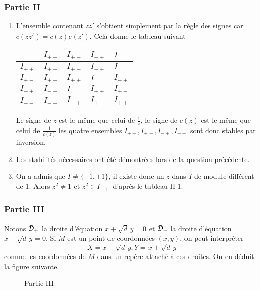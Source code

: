 \subsubsection*{Partie II}
\begin{enumerate}
\item L'ensemble contenant $zz'$ s'obtient simplement par la règle des signes car $c(zz')=c(z)c(z')$. Cela donne le tableau suivant
\begin{center}
\renewcommand{\arraystretch}{1.4}
\begin{tabular}{|c|c|c|c|c|} \hline
         & $I_{++}$ & $I_{+-}$ & $I_{-+}$ & $I_{--}$ \\ \hline
$I_{++}$ & $I_{++}$ & $I_{+-}$ & $I_{-+}$ & $I_{--}$ \\ \hline 
$I_{+-}$ & $I_{+-}$ & $I_{++}$ & $I_{--}$ & $I_{-+}$ \\ \hline
$I_{-+}$ & $I_{-+}$ & $I_{--}$ & $I_{++}$ & $I_{+-}$ \\ \hline
$I_{--}$ & $I_{--}$ & $I_{-+}$ & $I_{+-}$ & $I_{++}$ \\ \hline
\end{tabular}
\end{center}

Le signe de $z$ est le même que celui de $\frac{1}{z}$, le signe de $c(z)$ est le même que celui de $\frac{1}{c(z)}$ les quatre ensembles $I_{++},I_{+-},I_{-+},I_{--}$ sont donc stables par inversion.
\item Les stabilités nécessaires ont été démontrées lors de la question précédente.
\item On a admis que $I\not=\{-1,+1\}$, il existe donc un $z$ dans $I$ de module différent de 1. Alors $z^2 \not=1$ et $z^2\in I_{++}$ d'après le tableau II 1.
\end{enumerate}
\subsubsection*{Partie III}
Notons $\cal{D}_{+}$ la droite d'équation $x+\sqrt d\,y=0$ et $\cal{D}_{-}$ la droite d'équation $x-\sqrt d\,y=0$. Si $M$ est un point de coordonnées $(x,y)$, on peut interpréter 
$$X= x-\sqrt d\,y , Y= x+\sqrt d\,y $$ comme les coordonnées de $M$ dans un repère attaché à ces droites. On en déduit la figure suivante.
\begin{figure}
	\centering
	
	\caption{Partie III}
\end{figure} 

